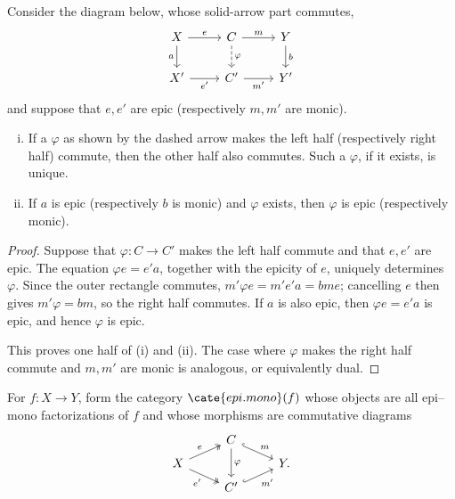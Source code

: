 \begin{lemma}\label{prop:epi-mono-morphism}
	Consider the diagram below, whose solid-arrow part commutes,
	\[\begin{tikzcd}
		X \arrow[r, "e"] \arrow[d, "a"'] & C \arrow[r, "m"] \arrow[dashed, d, "\varphi"] & Y \arrow[d, "b"] \\
		X' \arrow[r, "{e'}"'] & C' \arrow[r, "{m'}"'] & Y'
	\end{tikzcd}\]
	and suppose that $e,e'$ are epic (respectively $m,m'$ are monic).
	\begin{enumerate}[(i)]
		\item If a $\varphi$ as shown by the dashed arrow makes the left half (respectively right half) commute, then the other half also commutes. Such a $\varphi$, if it exists, is unique.
		\item If $a$ is epic (respectively $b$ is monic) and $\varphi$ exists, then $\varphi$ is epic (respectively monic).
	\end{enumerate}
\end{lemma}

\begin{proof}
	Suppose that $\varphi:C\to C'$ makes the left half commute and that $e,e'$ are epic. The equation $\varphi e=e'a$, together with the epicity of $e$, uniquely determines $\varphi$. Since the outer rectangle commutes, $m'\varphi e=m'e'a=bme$; cancelling $e$ then gives $m'\varphi=bm$, so the right half commutes. If $a$ is also epic, then $\varphi e=e'a$ is epic, and hence $\varphi$ is epic.

	This proves one half of (i) and (ii). The case where $\varphi$ makes the right half commute and $m,m'$ are monic is analogous, or equivalently dual.
\end{proof}

\begin{definition}
	For $f:X\to Y$, form the category $\cate{epi.mono}(f)$ whose objects are all epi--mono factorizations of $f$ and whose morphisms are commutative diagrams
	\[\begin{tikzcd}[row sep=tiny]
		& C \arrow[hookrightarrow, rd, "m"] \arrow[dd, "\varphi"] & \\
		X \arrow[twoheadrightarrow, ru, "e"] \arrow[twoheadrightarrow, rd, "{e'}"'] & & Y . \\
		& C' \arrow[hookrightarrow, ru, "{m'}"'] &
	\end{tikzcd}\]
\end{definition}

